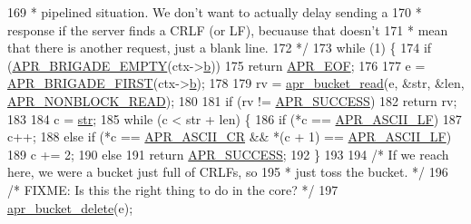 \begin{DoxyCode}
169 \textcolor{comment}{         * pipelined situation.  We don't want to actually delay sending a}
170 \textcolor{comment}{         * response if the server finds a CRLF (or LF), becuause that doesn't}
171 \textcolor{comment}{         * mean that there is another request, just a blank line.}
172 \textcolor{comment}{         */}
173         \textcolor{keywordflow}{while} (1) \{
174             \textcolor{keywordflow}{if} (\hyperlink{group__APR__Util__Bucket__Brigades_ga836f61da6cce15074eff257ce4b6fc0f}{APR\_BRIGADE\_EMPTY}(ctx->\hyperlink{structcore__filter__ctx_ab083b63e4b9c6f6a8b722fefd6e18da3}{b}))
175                 \textcolor{keywordflow}{return} \hyperlink{group__APR__Error_ga35d9dca2514c522a2840aca0f3e2ebd3}{APR\_EOF};
176 
177             e = \hyperlink{group__APR__Util__Bucket__Brigades_gab5826a11eb6ba90786a94282f806c230}{APR\_BRIGADE\_FIRST}(ctx->\hyperlink{structcore__filter__ctx_ab083b63e4b9c6f6a8b722fefd6e18da3}{b});
178 
179             rv = \hyperlink{group__APR__Util__Bucket__Brigades_gae44ae938c6c60e148430fdb098dcf28f}{apr\_bucket\_read}(e, &str, &len, \hyperlink{group__APR__Util__Bucket__Brigades_gga756973fb6392bd1026c3d96b4519776da42b97663ca71fbbf2e2af7c8192e5dd8}{APR\_NONBLOCK\_READ});
180 
181             \textcolor{keywordflow}{if} (rv != \hyperlink{group__apr__errno_ga9ee311b7bf1c691dc521d721339ee2a6}{APR\_SUCCESS})
182                 \textcolor{keywordflow}{return} rv;
183 
184             c = \hyperlink{group__MOD__DAV_gaab9226fe8f632e1f998e24276d478f30}{str};
185             \textcolor{keywordflow}{while} (c < str + len) \{
186                 \textcolor{keywordflow}{if} (*c == \hyperlink{group__apr__general_ga9e76601cef56a7a5b25f73fe6d57d7d9}{APR\_ASCII\_LF})
187                     c++;
188                 \textcolor{keywordflow}{else} \textcolor{keywordflow}{if} (*c == \hyperlink{group__apr__general_ga91c14ef7f03e82c07f4d3d56f63f8b6a}{APR\_ASCII\_CR} && *(c + 1) == 
      \hyperlink{group__apr__general_ga9e76601cef56a7a5b25f73fe6d57d7d9}{APR\_ASCII\_LF})
189                     c += 2;
190                 \textcolor{keywordflow}{else}
191                     \textcolor{keywordflow}{return} \hyperlink{group__apr__errno_ga9ee311b7bf1c691dc521d721339ee2a6}{APR\_SUCCESS};
192             \}
193 
194             \textcolor{comment}{/* If we reach here, we were a bucket just full of CRLFs, so}
195 \textcolor{comment}{             * just toss the bucket. */}
196             \textcolor{comment}{/* FIXME: Is this the right thing to do in the core? */}
197             \hyperlink{group__APR__Util__Bucket__Brigades_ga8925c02a7f95e8c1c3986294d4678797}{apr\_bucket\_delete}(e);

\end{DoxyCode}
